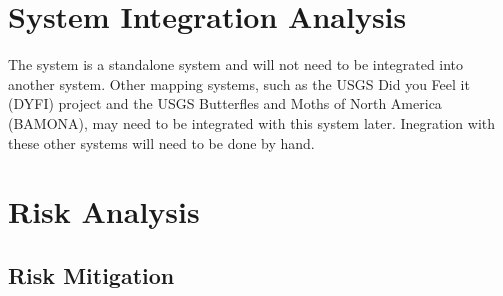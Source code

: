 \section{System Integration Analysis}
The system is a standalone system and will not need to be integrated into another system. Other mapping systems, such as the USGS Did you Feel it (DYFI) project and the USGS Butterfles and Moths of North America (BAMONA), may need to be integrated with this system later. Inegration with these other systems will need to be done by hand.

\section{Risk Analysis}

\subsection{Risk Mitigation}


